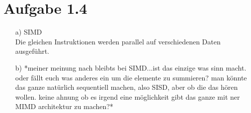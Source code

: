 \documentclass[a4paper,
               12pt,
               titlepage,
               BCOR12mm,
               ]{scrartcl}
\begin{document}
  \section*{Aufgabe 1.4}

    \begin{itemize}
      \item [a)] SIMD \\ Die gleichen Instruktionen werden parallel auf verschiedenen Daten ausgeführt.
      \item [b)] *meiner meinung nach bleibts bei SIMD...ist das einzige was sinn macht. oder fällt euch was anderes ein um die elemente zu summieren? man könnte das ganze natürlich sequentiell machen, also SISD, aber ob die das hören wollen. keine ahnung ob es irgend eine möglichkeit gibt das ganze mit ner MIMD architektur zu machen?*
    \end{itemize}

		\nocite{*}
		
		
\end{document}

